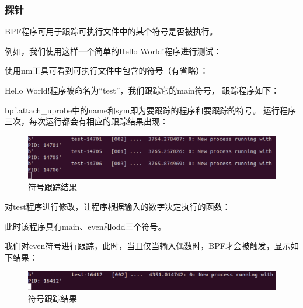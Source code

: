 \documentclass[AutoFakeBold,a4paper]{ctexart}
\begin{document}
\subsubsection{探针}

BPF程序可用于跟踪可执行文件中的某个符号是否被执行。

例如，我们使用这样一个简单的{\ttfamily Hello World!}程序进行测试：



使用{\ttfamily nm}工具可看到可执行文件中包含的符号（有省略）：



{\ttfamily Hello World!}程序被命名为“test”，我们跟踪它的{\ttfamily main}符号，
跟踪程序如下：



{\ttfamily bpf.attach\_uprobe}中的{\ttfamily name}和{\ttfamily sym}即为要跟踪的程序和要跟踪的符号。
运行程序三次，每次运行都会有相应的跟踪结果出现：

\begin{figure}[H]
    \centering
    \includegraphics[width=\columnwidth]{uprobe/test.png}
    \caption{符号跟踪结果}
\end{figure}

对{\ttfamily test}程序进行修改，让程序根据输入的数字决定执行的函数：



此时该程序具有{\ttfamily main}、{\ttfamily even}和{\ttfamily odd}三个符号。



我们对{\ttfamily even}符号进行跟踪，此时，当且仅当输入偶数时，BPF才会被触发，显示如下结果：

\begin{figure}[H]
    \centering
    \includegraphics[width=\columnwidth]{uprobe/even.png}
    \caption{符号跟踪结果}
\end{figure}
\end{document}

